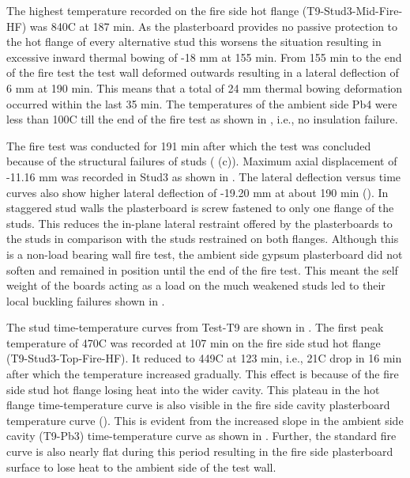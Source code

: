 The highest temperature recorded on the fire side hot flange (T9-Stud3-Mid-Fire-HF) was 840\degree C at 187 min. As the plasterboard provides no passive protection to the hot flange of every alternative stud this worsens the situation resulting in excessive inward thermal bowing of -18 mm at 155 min. From 155 min to the end of the fire test the test wall deformed outwards resulting in a lateral deflection of 6 mm at 190 min. This means that a total of 24 mm thermal bowing deformation occurred within the last 35 min. The temperatures of the ambient side Pb4 were less than 100\degree C till the end of the fire test as shown in , i.e., no insulation failure. 
 
The fire test was conducted for 191 min after which the test was concluded because of the structural failures of studs ( (c)). Maximum axial displacement of -11.16 mm was recorded in Stud3 as shown in . The lateral deflection versus time curves also show higher lateral deflection of -19.20 mm at about 190 min (). In staggered stud walls the plasterboard is screw fastened to only one flange of the studs. This reduces the in-plane lateral restraint offered by the plasterboards to the studs in comparison with the studs restrained on both flanges. Although this is a non-load bearing wall fire test, the ambient side gypsum plasterboard did not soften and remained in position until the end of the fire test. This meant the self weight of the boards acting as a load on the much weakened studs led to their local buckling failures shown in .

The stud time-temperature curves from Test-T9 are shown in . The first peak temperature of 470\degree C was recorded at 107 min on the fire side stud hot flange (T9-Stud3-Top-Fire-HF). It reduced to 449\degree C at 123 min, i.e., 21\degree C drop in 16 min after which the temperature increased gradually. This effect is because of the fire side stud hot flange losing heat into the wider cavity. This plateau in the hot flange time-temperature curve is also visible in the fire side cavity plasterboard temperature curve (). This is evident from the increased slope in the ambient side cavity (T9-Pb3) time-temperature curve as shown in . Further, the standard fire curve is also nearly flat during this period resulting in the fire side plasterboard surface to lose heat to the ambient side of the test wall.  

